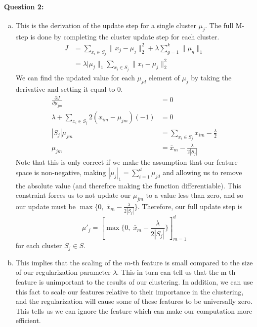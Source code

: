 \documentclass[letterpaper,11pt]{article}
\begin{document}
\paragraph{Question 2:}
\begin{enumerate}[(a)]
    \item
        This is the derivation of the update step for a single cluster $\mu_j$.
        The full M-step is done by completing the cluster update step for
        each cluster.
        \begin{align}
            J & = \sum_{x_i\in S_j}\|x_j-\mu_j\|_2^2 + \lambda\sum_{g=1}^k\|\mu_g\|_1\\
              & = \lambda|\mu_j\|_1\sum_{x_i\in S_j}\|x_i-\mu_j\|_2^2
        \end{align}
        We can find the updated value for each $\mu_{jd}$ element of $\mu_j$
        by taking the derivative and setting it equal to $0$.
        \begin{align}
            \frac{\partial J}{\partial \mu_{jm}} & = 0\\
        \lambda + \sum_{x_i \in S_j} 2 (x_{im} - \mu_{jm}) (-1) & = 0\\
                                                 |S_j| \mu_{jm} & = \sum_{x_i \in S_j} x_{im} - \frac{\lambda}{2}\\
                                                       \mu_{jm} & = \bar{x}_m - \frac{\lambda}{2 |S_j|}
        \end{align}
        Note that this is only correct if we make the assumption that our feature space
        is non-negative, making $|\mu_j|_1 = \sum_{i=1}^d \mu_{jd}$ and allowing us
        to remove the absolute value (and therefore making the function differentiable).
        This constraint forces us to not update our $\mu_{jm}$ to a value less than
        zero, and so our update must be $\max\{0,\; \bar{x}_m - \frac{\lambda}{2 |S_j|}\}$.
        Therefore, our full update step is
        \begin{equation}
            \mu'_{j} = [\max\{0, \;\bar{x}_m - \frac{\lambda}{2 |S_j|}\}]_{m=1}^d
        \end{equation}
        for each cluster $S_j \in S$.
    \item
        This implies that the scaling of the $m$-th feature is small compared
        to the size of our regularization parameter $\lambda$. This in turn can
        tell us that the m-th feature is unimportant to the results of our clustering.
        In addition, we can use this fact to scale our features relative to their
        importance in the clustering, and the regularization will cause some
        of these features to be universally zero. This tells us we can ignore the
        feature which can make our computation more efficient.
\end{enumerate}
\end{document}
